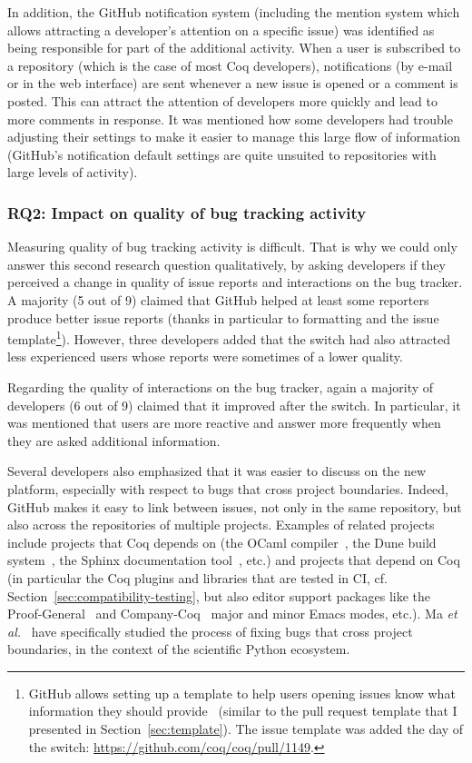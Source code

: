In addition, the GitHub notification system (including the mention system which allows attracting a developer's attention on a specific issue) was identified as being responsible for part of the additional activity. When a user is subscribed to a repository (which is the case of most Coq developers), notifications (by e-mail or in the web interface) are sent whenever a new issue is opened or a comment is posted. This can attract the attention of developers more quickly and lead to more comments in response. It was mentioned how some developers had trouble adjusting their settings to make it easier to manage this large flow of information (GitHub's notification default settings are quite unsuited to repositories with large levels of activity).

\subsubsection{RQ2: Impact on quality of bug tracking activity}

Measuring quality of bug tracking activity is difficult.
That is why we could only answer this second research question qualitatively, by asking developers if they perceived a change in quality of issue reports and interactions on the bug tracker.
A majority (5 out of 9) claimed that GitHub helped at least some reporters produce better issue reports (thanks in particular to formatting and the issue template\footnote{
	GitHub allows setting up a template to help users opening issues know what information they should provide~\cite{github_issue_template} (similar to the pull request template that I presented in Section~\ref{sec:template}).
	The issue template was added the day of the switch: \url{https://github.com/coq/coq/pull/1149}.
}).
However, three developers added that the switch had also attracted less experienced users whose reports were sometimes of a lower quality.

Regarding the quality of interactions on the bug tracker, again a majority of developers (6 out of 9) claimed that it improved after the switch. In particular, it was mentioned that users are more reactive and answer more frequently when they are asked additional information.

Several developers also emphasized that it was easier to discuss on the new platform, especially with respect to bugs that cross project boundaries. Indeed, GitHub makes it easy to link between issues, not only in the same repository, but also across the repositories of multiple projects. Examples of related projects include projects that Coq depends on (the OCaml compiler~\cite{leroy:hal-00930213}, the Dune build system~\cite{dimino2016dune}, the Sphinx documentation tool~\cite{sphinx}, etc.) and projects that depend on Coq (in particular the Coq plugins and libraries that are tested in CI, cf. Section~\ref{sec:compatibility-testing}, but also editor support packages like the Proof-General~\cite{aspinall2000proof} and Company-Coq~\cite{pitclaudel2016company} major and minor Emacs modes, etc.).
Ma \emph{et al.}~\cite{ma2017developers} have specifically studied the process of fixing bugs that cross project boundaries, in the context of the scientific Python ecosystem.

